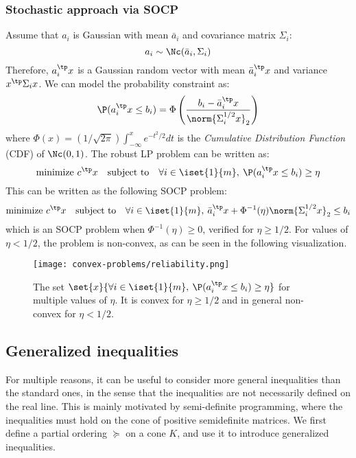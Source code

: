 \subsubsection{Stochastic approach via SOCP}
Assume that $a_i$ is Gaussian with mean $\bar{a}_i$ and covariance matrix $\Sigma_i$:
\begin{equation*}
    a_i\sim\Nc(\bar{a}_i, \Sigma_i)
\end{equation*}
Therefore, $a_i^\tp x$ is a Gaussian random vector with mean $\bar{a}_i^\tp x$ and variance $x^\tp\Sigma_i x$. We can model the probability constraint as:
\begin{equation*}
    \P(a_i^\tp x\leq b_i)=\Phi\left(\frac{b_i-\bar{a}_i^\tp x}{\norm{\Sigma_i^{1/2}x}_2}\right)
\end{equation*}
where $\Phi(x)=(1/\sqrt{2\pi})\int_{-\infty}^x e^{-t^2/2}dt$ is the \emph{Cumulative Distribution Function} (CDF) of $\Nc(0,1)$. The robust LP problem can be written as:
\begin{equation*}
    \text{minimize } c^\tp x \quad\text{subject to}\quad \forall i\in\iset{1}{m}, \: \P(a_i^\tp x\leq b_i)\geq\eta
\end{equation*}
This can be written as the following SOCP problem:
\begin{equation*}
    \text{minimize } c^\tp x \quad\text{subject to}\quad \forall i\in\iset{1}{m}, \: \bar{a}_i^\tp x+\Phi^{-1}(\eta)\norm{\Sigma_i^{1/2}x}_2\leq b_i
\end{equation*}
which is an SOCP problem when $\Phi^{-1}(\eta)\geq0$, verified for $\eta\geq1/2$. For values of $\eta<1/2$, the problem is non-convex, as can be seen in the following visualization.
\begin{figure}[H]
    \centering
    \texttt{[image: convex-problems/reliability.png]}
    \caption{The set $\set{x}{\forall i\in\iset{1}{m}, \: \P(a_i^\tp x\leq b_i)\geq\eta}$ for multiple values of $\eta$. It is convex for $\eta\geq1/2$ and in general non-convex for $\eta<1/2$.}
\end{figure}

\subsection{Generalized inequalities}
For multiple reasons, it can be useful to consider more general inequalities than the standard ones, in the sense that the inequalities are not necessarily defined on the real line. This is mainly motivated by semi-definite programming, where the inequalities must hold on the cone of positive semidefinite matrices. We first define a partial ordering $\succcurlyeq$ on a cone $K$, and use it to introduce generalized inequalities.

